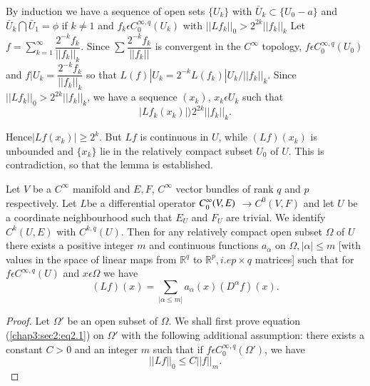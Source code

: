 By induction we have a sequence of open sets $\{U_k\}$ with $\bar{U}_k
\subset \{U_0 - a\}$ and $\bar{U}_k \bigcap \bar{U}_1 = \phi$ if $k
\neq 1$ and $f_k \epsilon C^{\infty,q}_0 (U_k)$ with $||Lf_k||_0 >
2^{2k} ||f_k||_k$ Let $f=\sum\limits^\infty_{k=1} \dfrac{2^{-k} f_k}
{||f_k||_k}$. Since $\sum \dfrac { 2^{-k} f_k} {||f_k||}$ is
convergent in the $C^\infty$ topology, $f \epsilon C^{\infty,q}_0
(U_0)$ and $ f |U_k = \dfrac {2^{-k} f_k} {||f_k||_k}$ so that $L(f) |
U_k = 2^{-k} L (f_k)| U_k \big/ ||f_k||_k$. Since $||Lf_k||_0 > 2^{2k}
||f_k||_k$, we have a sequence $(x_k)$, $x_k \epsilon U_k$ such
that 
$$
\big| Lf_k (x_k)\big| \rangle 2^{2k} ||f_k||_k.
$$

Hence\pageoriginale $|Lf (x_k)| \ge 2^k$. But $Lf$ is continuous in $U$, while $(Lf)
(x_k)$ is unbounded and $\{x_k\}$ lie in the relatively compact subset
$U_0 $ of $U$. This is contradiction, so that the lemma is
established. 

\begin{theorem*}[(Peetre)]%
  Let $V$ be a $C^\infty$ manifold and $E,F$, $C^\infty$ vector
  bundles of rank $q$ and $p$ respectively. Let $L $be a differential
  operator $C^\infty_0 (V,\break E)$ $\to C^0 (V, F)$  and let $U$ be a
  coordinate neighbourhood such that $E_U$ and $F_U$ are trivial. We
  identify $C^k(U, E)$ with $C^{k,q}(U)$. Then for any relatively
  compact open subset $\Omega$ of $U$ there exists a positive integer
  $m$ and continuous functions $a_\alpha$ on $\Omega, |\alpha| \le m$
  [with values in the space of linear maps from $\mathbb{R}^q$ to
    $\mathbb{R}^p,i.e p \times q$ matrices] such that for $f
  \epsilon C^{\infty,q}(U)$ and $x \epsilon \Omega$ we have 
  \begin{equation}
    (Lf)(x) = \sum_{|\alpha \le m|} a_\alpha (x) (D^\alpha f)
    (x).\tag{2.1}\label{chap3:sec2:eq2.1} 
  \end{equation}
\end{theorem*}

\begin{proof}
  Let $\Omega'$ be an open subset of $\Omega$. We shall first prove
  equation (\ref{chap3:sec2:eq2.1}) on $\Omega'$ with the following additional
  assumption: there exists a constant $C > 0$ and an integer $m$ such
  that if $f \epsilon C_0^{\infty, q} (\Omega')$, we have 
  \begin{equation}
    || Lf ||_0 \le C || f ||_m. \tag{2.2}\label{chap3:sec2:eq2.2}
  \end{equation}
\end{proof}

